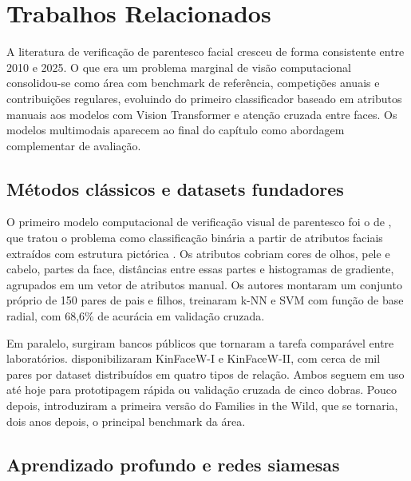 \chapter[Trabalhos Relacionados]{Trabalhos Relacionados}
\label{cap:trabalhos-relacionados}

A literatura de verificação de parentesco facial cresceu de forma consistente entre 2010 e 2025. O que era um problema marginal de visão computacional consolidou-se como área com benchmark de referência, competições anuais e contribuições regulares, evoluindo do primeiro classificador baseado em atributos manuais aos modelos com Vision Transformer e atenção cruzada entre faces. Os modelos multimodais aparecem ao final do capítulo como abordagem complementar de avaliação.

\section{Métodos clássicos e datasets fundadores}

O primeiro modelo computacional de verificação visual de parentesco foi o de , que tratou o problema como classificação binária a partir de atributos faciais extraídos com estrutura pictórica \cite{felzenszwalb2005pictorial}. Os atributos cobriam cores de olhos, pele e cabelo, partes da face, distâncias entre essas partes e histogramas de gradiente, agrupados em um vetor de atributos manual. Os autores montaram um conjunto próprio de 150 pares de pais e filhos, treinaram k-NN e SVM com função de base radial, com 68,6\% de acurácia em validação cruzada.

Em paralelo, surgiram bancos públicos que tornaram a tarefa comparável entre laboratórios. 
disponibilizaram KinFaceW-I e KinFaceW-II, com cerca de mil pares por dataset distribuídos em quatro tipos de relação. Ambos seguem em uso até hoje para prototipagem rápida ou validação cruzada de cinco dobras. Pouco depois, 
introduziram a primeira versão do Families in the Wild, que se tornaria, dois anos depois, o principal benchmark da área.

\section{Aprendizado profundo e redes siamesas}

